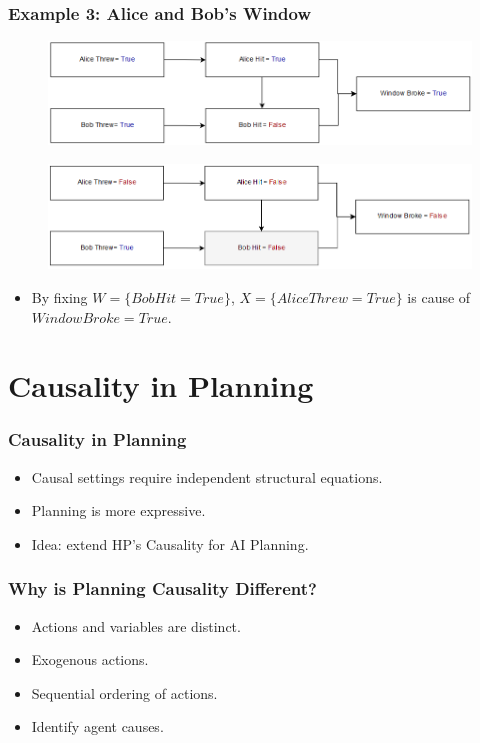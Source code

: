 \documentclass{beamer}
\theoremstyle{plain}
\theoremstyle{definition}
\begin{document}
\begin{frame}
\frametitle{Example 3: Alice and Bob's Window}
\begin{figure}
\includegraphics[scale=.40]{alicebobModelReal}
\end{figure}

\begin{figure}
\includegraphics[scale=.40]{alicebobModelCounterfactual3}
\end{figure}

\begin{itemize}
\item By fixing $W=\{Bob Hit = True\}$, $X=\{Alice Threw = True\}$ is cause of $Window Broke = True$.
\end{itemize}
\end{frame}

\section{Causality in Planning}

\begin{frame}
\frametitle{Causality in Planning}
\begin{itemize}
\item Causal settings require independent structural equations.
\item Planning is more expressive.
\item Idea: extend HP's Causality for AI Planning.
\end{itemize}

\end{frame}



\begin{frame}
\frametitle{Why is Planning Causality Different?}
\begin{itemize}
\item Actions and variables are distinct.
\item Exogenous actions.
\item Sequential ordering of actions.
\item Identify agent causes.
\end{itemize}

\end{frame}
\end{document}
